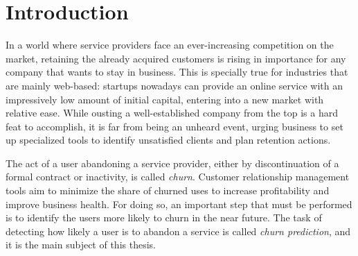 \documentclass{kththesis}
\begin{document}
\clearpage

\cleardoublepage

\tableofcontents

\listoffigures
 
\listoftables


\mainmatter


\chapter{Introduction}

		In a world where service providers face an ever-increasing competition on the market, retaining the already acquired customers is rising in importance for any company that wants to stay in business. This is specially true for industries that are mainly web-based: startups nowadays can provide an online service with  an impressively low amount of initial capital, entering into a new market with relative ease. While ousting a well-established company from the top is a hard feat to accomplish, it is far from being an unheard event, urging business to set up specialized tools to identify unsatisfied clients and plan retention actions. 
		
	The act of a user abandoning a service provider, either by discontinuation of a formal contract or inactivity, is called \emph{churn}. Customer relationship management tools aim to minimize the share of churned uses to increase profitability and improve business health. For doing so, an important step that must be performed is to identify the users more likely to churn in the near future. The task of detecting how likely a user is to abandon a service is called \emph{churn prediction}, and it is the main subject of this thesis.
	
\end{document}
